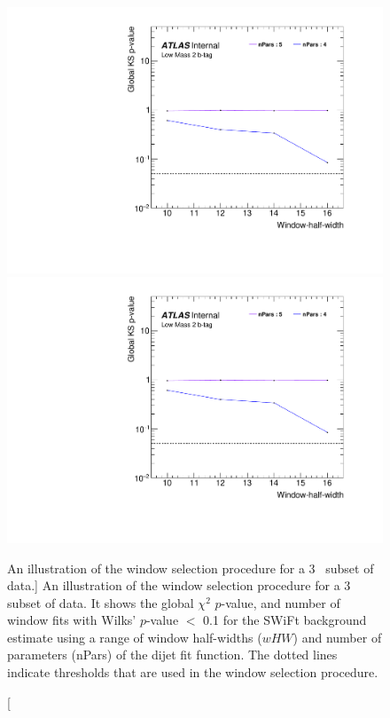 \begin{figure}[!htb]
\captionsetup[subfigure]{aboveskip=0pt,justification=centering}
\centering
{} {
  \includegraphics[width=0.45\linewidth, angle=0,page=2]{figs/Dibjet/LowMass/FitStudy_min566/windowSel_subset.pdf}
}\hspace{-8mm}
 {
  \includegraphics[width=0.45\linewidth, angle=0,page=4]{figs/Dibjet/LowMass/FitStudy_min566/windowSel_subset.pdf}
}

\vspace{-0.5em}
\caption
    [An illustration of the window selection procedure for a 3~\ifb{} subset of \lm{} data.]
    {\label{fig:windowSel_subset}
      An illustration of the window selection procedure for a 3~\ifb{} subset of \lm{} data.
      It shows the global $\chi^{2}$ \mbox{$p$-value}, %
      and number of window fits with Wilks' \mbox{$p$-value} $<$ 0.1 for the SWiFt background estimate
      using a range of window half-widths ($wHW$) and number of parameters (nPars) of the dijet fit function.
      The dotted lines indicate thresholds that are used in the window selection procedure.
    }
\vspace{-1em}
\end{figure}


